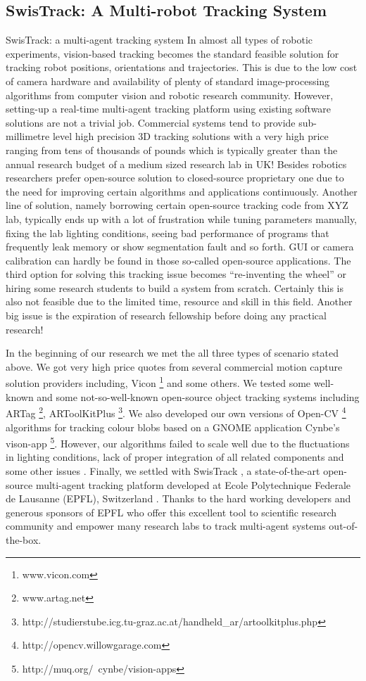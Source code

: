 \subsection{SwisTrack: A Multi-robot Tracking System}
\label{expt-tools:mrts}
SwisTrack: a multi-agent tracking system
In almost all types of robotic experiments, vision-based tracking becomes the standard feasible solution for tracking robot positions, orientations and trajectories. This is due to the low cost of camera hardware and availability of plenty of standard image-processing algorithms from computer vision and robotic research community. However,  setting-up a real-time multi-agent tracking platform using existing software solutions are not a trivial job. Commercial systems tend to provide sub-millimetre level high precision 3D tracking solutions with a very high price ranging from tens of thousands of pounds which is typically greater than the annual research budget of a medium sized research lab in UK! Besides robotics researchers prefer open-source solution to closed-source proprietary one due to the need  for improving certain algorithms and applications continuously. Another line of solution, namely borrowing certain open-source tracking code from XYZ lab, typically ends up with a lot of frustration while tuning parameters manually, fixing the lab lighting conditions, seeing bad performance of programs that frequently leak  memory or show segmentation fault and so forth. GUI or camera calibration can hardly be found in those so-called open-source applications. The third option for solving this tracking issue becomes ``re-inventing the wheel'' or hiring some research students to build a system from scratch. Certainly this is also not feasible due to the limited time, resource and skill in this field. Another big issue is the expiration of research fellowship before doing any practical research!

In the beginning of our research we met the all three types of scenario stated above. We got very high price quotes from several commercial motion capture solution providers including,  Vicon \footnote{www.vicon.com} and some others. We tested some well-known and some not-so-well-known open-source object tracking systems including ARTag \footnote{www.artag.net}, ARToolKitPlus \footnote{http://studierstube.icg.tu-graz.ac.at/handheld\_ar/artoolkitplus.php}. We also developed our own versions of Open-CV \footnote{http://opencv.willowgarage.com}  algorithms for tracking colour blobs based on a GNOME application Cynbe's vison-app \footnote{http://muq.org/~cynbe/vision-apps}. However, our algorithms failed to scale well due to the fluctuations in lighting conditions, lack of proper integration of all related components  and some other issues \cite{Sarker2008}. Finally, we settled with SwisTrack \cite{Lochmatter+2008} , a state-of-the-art open-source  multi-agent tracking platform developed at  Ecole Polytechnique Federale de Lausanne (EPFL), Switzerland . Thanks to the hard working developers and generous sponsors of EPFL who offer this excellent tool to scientific research community and empower many research labs to track multi-agent systems out-of-the-box.

